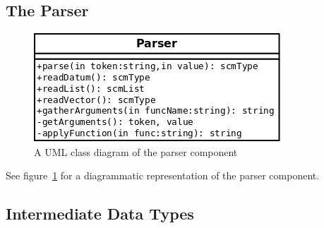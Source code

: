 \subsection{The Parser}

\begin{figure}
\centering
\includegraphics[width=\textwidth]{parserUML.png}
\caption{A UML class diagram of the parser component}
\label{fig:parserUML}
\end{figure}

See figure~\ref{fig:parserUML} for a diagrammatic representation of the parser
component.

\subsection{Intermediate Data Types}

